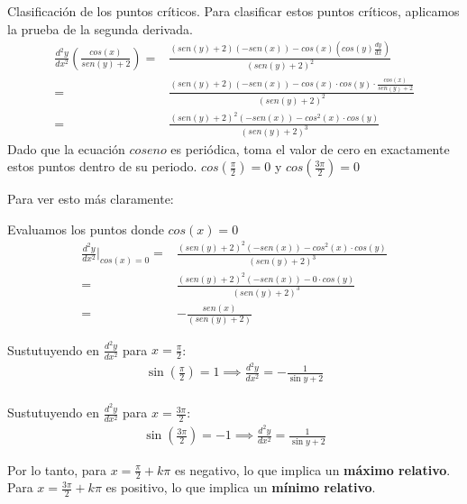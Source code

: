 \vspace{-20px}
\noindent
Clasificación de los puntos críticos. Para clasificar estos puntos críticos, aplicamos la prueba de la segunda derivada.
\begin{align*}
	\frac{d^2y}{dx^2}\left(\frac{cos (x)}{sen(y)+2}\right)= & \frac{(sen(y)+2)\left(-sen(x)\right)-cos(x)\left(cos(y)\frac{dy}{dx}\right)}{\left(sen(y)+2\right)^2}         \\
	=                                                       & \frac{(sen(y)+2)\left(-sen(x)\right)-cos(x)\cdot cos(y)\cdot\frac{cos(x)}{sen(y)+2}}{\left(sen(y)+2\right)^2} \\
	=                                                       & \frac{(sen(y)+2)^2\left(-sen(x)\right)-cos^2(x)\cdot cos(y)}{\left(sen(y)+2\right)^3}
\end{align*}
Dado que la ecuación $coseno$ es periódica, toma el valor de cero en exactamente estos puntos dentro de su periodo.
$cos\left(\frac{\pi}{2}\right)=0$ y $cos\left(\frac{3\pi}{2}\right)=0$

Para ver esto más claramente:

Evaluamos los puntos donde $cos(x)=0$
\begin{align*}
	\frac{d^2y}{dx^2}\bigg|_{cos (x)=0}= & \frac{(sen(y)+2)^2\left(-sen(x)\right)-cos^2(x)\cdot cos(y)}{\left(sen(y)+2\right)^3} \\
	=                                          & \frac{(sen(y)+2)^2\left(-sen(x)\right)-0\cdot cos(y)}{\left(sen(y)+2\right)^3}                                     \\
	=                                          & -\frac{sen(x)}{\left(sen(y)+2\right)}                                          
\end{align*}
\vspace{-20px}
\begin{multicols}{2}
    Sustutuyendo en $\frac{d^2y}{dx^2}$ para $x=\frac{\pi}{2}$:
    \noindent
    \begin{align*}
        \sin\left(\frac{\pi}{2}\right) = 1 \implies \frac{d^2y}{dx^2} = -\frac{1}{\sin y + 2}
    \end{align*}
    \columnbreak\\
    Sustutuyendo en $\frac{d^2y}{dx^2}$ para $x=\frac{3\pi}{2}$:
    \begin{align*}
        \sin\left(\frac{3\pi}{2}\right) = -1 \implies \frac{d^2y}{dx^2} = \frac{1}{\sin y + 2}
    \end{align*}
\end{multicols}
\noindent
Por lo tanto, para $x = \frac{\pi}{2}+k\pi$ es negativo, lo que implica un \textbf{máximo relativo}.\\
Para $x = \frac{3\pi}{2}+k\pi$ es positivo, lo que implica un \textbf{mínimo relativo}.
